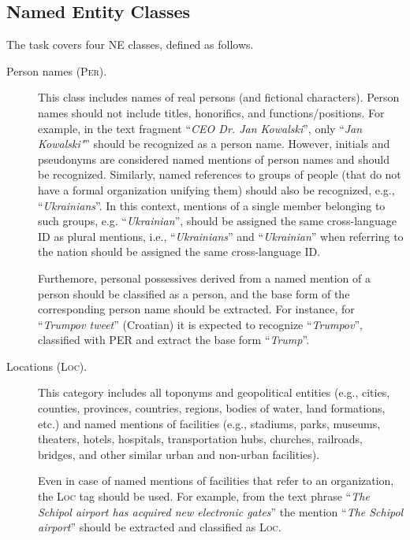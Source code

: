\documentclass[11pt]{article}
\begin{document}
\subsection{Named Entity Classes}

{The task covers four NE classes, defined as follows.}

\begin{description}

\item[Person names (\textsc{Per}).] {This class includes names of
    real persons (and fictional characters).} Person names should not
  include titles, honorifics, and functions/positions. For example, in
  the text fragment ``\textit{CEO Dr. Jan Kowalski}'', only ``\textit{Jan
    Kowalski"}'' should be recognized as a person name. However, initials
  and pseudonyms are considered named mentions of person names and should
  be recognized.  Similarly, named references to groups of people (that
  do not have a formal organization unifying them) should also be
  recognized, e.g., ``\textit{Ukrainians}''. In this context, mentions of
  a single member belonging to such groups, e.g.  ``\textit{Ukrainian}'',
  should be assigned the same cross-language ID as plural mentions, i.e.,
  ``\textit{Ukrainians}'' and ``\textit{Ukrainian}'' when referring to
  the nation should be assigned the same cross-language ID.

  Furthemore, personal possessives derived from a named mention of a person should
  be classified as a person, and the base form of the corresponding
  person name should be extracted. For instance, for
  ``\textit{Trumpov tweet}'' (Croatian) it is expected to recognize
  ``\textit{Trumpov}'', classified with PER and extract the base
  form ``\textit{Trump}''.


\item[Locations (\textsc{Loc}).]

This category includes all toponyms and geopolitical entities (e.g., cities,
counties, provinces, countries, regions, bodies of water, land formations,
etc.) and named mentions of facilities (e.g., stadiums, parks, museums,
theaters, hotels, hospitals, transportation hubs, churches, railroads, bridges,
and other similar urban and non-urban facilities).

Even in case of named mentions of facilities that refer to an organization, the
\textsc{Loc} tag should be used. For example, from the text phrase
``\textit{The Schipol airport has acquired new electronic gates}'' the mention
``\textit{The Schipol airport}'' should be extracted and classified as
\textsc{Loc}.


\end{description}
\end{document}
